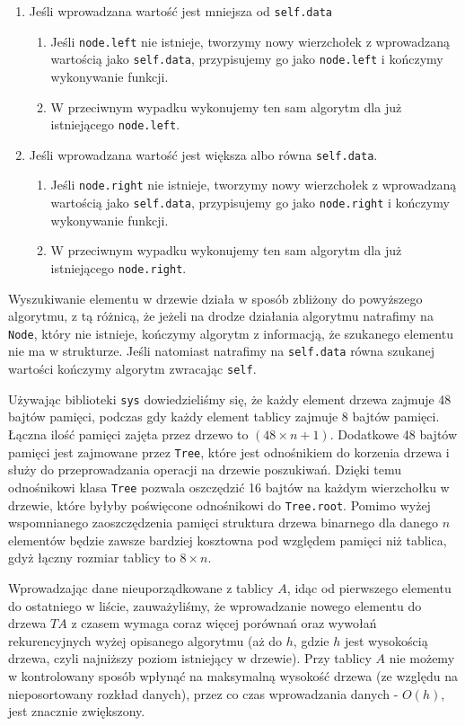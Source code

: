 \documentclass{article}
\begin{document}
\begin{enumerate}
	\item Jeśli wprowadzana wartość jest mniejsza od \verb+self.data+
		\begin{enumerate}
			\item Jeśli \verb+node.left+ nie istnieje, tworzymy nowy wierzchołek z wprowadzaną wartością jako \verb+self.data+, przypisujemy go jako \verb+node.left+ i kończymy wykonywanie funkcji.
			\item W przeciwnym wypadku wykonujemy ten sam algorytm dla już istniejącego \verb+node.left+.
		\end{enumerate}
	\item Jeśli wprowadzana wartość jest większa albo równa \verb+self.data+.
		\begin{enumerate}
			\item Jeśli \verb+node.right+ nie istnieje, tworzymy nowy wierzchołek z wprowadzaną wartością jako \verb+self.data+, przypisujemy go jako \verb+node.right+ i kończymy wykonywanie funkcji.
			\item W przeciwnym wypadku wykonujemy ten sam algorytm dla już istniejącego \verb+node.right+.
		\end{enumerate}
\end{enumerate}

Wyszukiwanie elementu w drzewie działa w sposób zbliżony do powyższego algorytmu, z tą różnicą, że jeżeli na drodze działania algorytmu natrafimy na \verb+Node+, który nie istnieje, kończymy algorytm z informacją, że szukanego elementu nie ma w strukturze. Jeśli natomiast natrafimy na \verb+self.data+ równa szukanej wartości kończymy algorytm zwracając \verb+self+.

Używając biblioteki \verb+sys+ dowiedzieliśmy się, że każdy element drzewa zajmuje 48 bajtów pamięci, podczas gdy każdy element tablicy zajmuje 8 bajtów pamięci. Łączna ilość pamięci zajęta przez drzewo to $(48\times n+1)$. Dodatkowe 48 bajtów pamięci jest zajmowane przez \verb+Tree+, które jest odnośnikiem do korzenia drzewa i służy do przeprowadzania operacji na drzewie poszukiwań. Dzięki temu odnośnikowi klasa \verb+Tree+ pozwala oszczędzić 16 bajtów na każdym wierzchołku w drzewie, które byłyby poświęcone odnośnikowi do \verb+Tree.root+.
Pomimo wyżej wspomnianego zaoszczędzenia pamięci struktura drzewa binarnego dla danego $n$ elementów będzie zawsze bardziej kosztowna pod względem pamięci niż tablica, gdyż łączny rozmiar tablicy to $8 \times n$.

Wprowadzając dane nieuporządkowane z tablicy $A$, idąc od pierwszego elementu do ostatniego w liście, zauważyliśmy, że wprowadzanie nowego elementu do drzewa $TA$ z czasem wymaga coraz więcej porównań oraz wywołań rekurencyjnych wyżej opisanego algorytmu (aż do $h$, gdzie $h$ jest wysokością drzewa, czyli najniższy poziom istniejący w drzewie). Przy tablicy $A$ nie możemy w kontrolowany sposób wpłynąć na maksymalną wysokość drzewa (ze względu na nieposortowany rozkład danych), przez co czas wprowadzania danych - $O(h)$, jest znacznie zwiększony.
\end{document}

